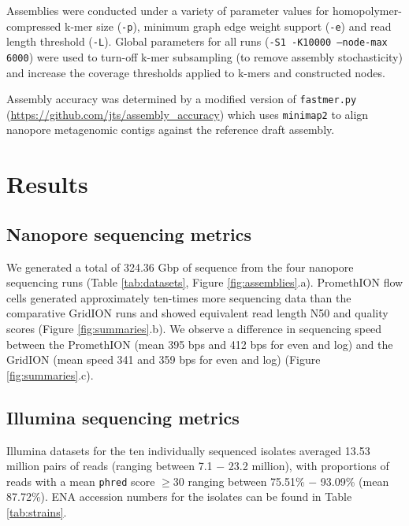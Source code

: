 \documentclass[a4paper,num-refs]{oup-contemporary}
\begin{document}
Assemblies were conducted under a variety of parameter values for homopolymer-compressed k-mer size (\texttt{-p}), minimum graph edge weight support (\texttt{-e}) and read length threshold (\texttt{-L}). Global parameters for all runs (\texttt{-S1 -K10000 --node-max 6000}) were used to turn-off k-mer subsampling (to remove assembly stochasticity) and increase the coverage thresholds applied to k-mers and constructed nodes.

Assembly accuracy was determined by a modified version of \texttt{fastmer.py} (\url{https://github.com/jts/assembly\_accuracy}) which uses \texttt{minimap2} to align nanopore metagenomic contigs against the reference draft assembly.

\section{Results}

\subsection{Nanopore sequencing metrics}

We generated a total of 324.36 Gbp of sequence from the four nanopore sequencing runs (Table \ref{tab:datasets}, Figure \ref{fig:assemblies}.a).
PromethION flow cells generated approximately ten-times more sequencing data than the comparative GridION runs and showed equivalent read length N50 and quality scores (Figure \ref{fig:summaries}.b).
We observe a difference in sequencing speed between the PromethION (mean 395 bps and 412 bps for even and log) and the GridION (mean speed 341 and 359 bps for even and log) (Figure \ref{fig:summaries}.c).

\subsection{Illumina sequencing metrics}

Illumina datasets for the ten individually sequenced isolates averaged 13.53 million pairs of reads (ranging between 7.1 $-$ 23.2 million), with proportions of reads with a mean \texttt{phred} score $\geq$30 ranging between 75.51\% $-$ 93.09\% (mean 87.72\%).
ENA accession numbers for the isolates can be found in Table \ref{tab:strains}.

\end{document}
